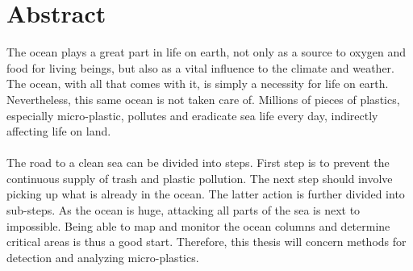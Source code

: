 \chapter*{Abstract}

The ocean plays a great part in life on earth, not only as a source to oxygen and food for living beings, but also as a vital influence to the climate and weather. The ocean, with all that comes with it, is simply a necessity for life on earth. Nevertheless, this same ocean is not taken care of. Millions of pieces of plastics, especially micro-plastic, pollutes and eradicate sea life every day, indirectly affecting life on land. 
\\\\
The road to a clean sea can be divided into steps. First step is to prevent the continuous supply of trash and plastic pollution. The next step should involve picking up what is already in the ocean. The latter action is further divided into sub-steps. As the ocean is huge, attacking all parts of the sea is next to impossible. Being able to map and monitor the ocean columns and determine critical areas is thus a good start. Therefore, this thesis will concern methods for detection and analyzing micro-plastics. 


\hypersetup{pageanchor=false}
